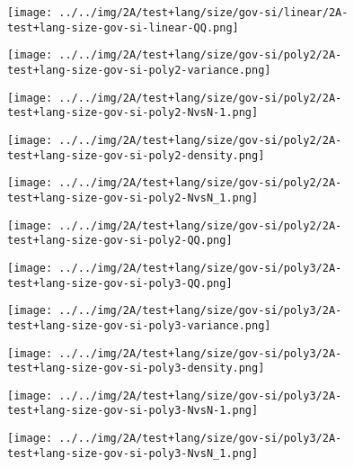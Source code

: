 \begin{figure}[H]
\centering	\texttt{[image: ../../img/2A/test+lang/size/gov-si/linear/2A-test+lang-size-gov-si-linear-QQ.png]}
\end{figure}
\begin{figure}[H]
\centering	\texttt{[image: ../../img/2A/test+lang/size/gov-si/poly2/2A-test+lang-size-gov-si-poly2-variance.png]}
\end{figure}
\begin{figure}[H]
\centering	\texttt{[image: ../../img/2A/test+lang/size/gov-si/poly2/2A-test+lang-size-gov-si-poly2-NvsN-1.png]}
\end{figure}
\begin{figure}[H]
\centering	\texttt{[image: ../../img/2A/test+lang/size/gov-si/poly2/2A-test+lang-size-gov-si-poly2-density.png]}
\end{figure}
\begin{figure}[H]
\centering	\texttt{[image: ../../img/2A/test+lang/size/gov-si/poly2/2A-test+lang-size-gov-si-poly2-NvsN\_1.png]}
\end{figure}
\begin{figure}[H]
\centering	\texttt{[image: ../../img/2A/test+lang/size/gov-si/poly2/2A-test+lang-size-gov-si-poly2-QQ.png]}
\end{figure}
\begin{figure}[H]
\centering	\texttt{[image: ../../img/2A/test+lang/size/gov-si/poly3/2A-test+lang-size-gov-si-poly3-QQ.png]}
\end{figure}
\begin{figure}[H]
\centering	\texttt{[image: ../../img/2A/test+lang/size/gov-si/poly3/2A-test+lang-size-gov-si-poly3-variance.png]}
\end{figure}
\begin{figure}[H]
\centering	\texttt{[image: ../../img/2A/test+lang/size/gov-si/poly3/2A-test+lang-size-gov-si-poly3-density.png]}
\end{figure}
\begin{figure}[H]
\centering	\texttt{[image: ../../img/2A/test+lang/size/gov-si/poly3/2A-test+lang-size-gov-si-poly3-NvsN-1.png]}
\end{figure}
\begin{figure}[H]
\centering	\texttt{[image: ../../img/2A/test+lang/size/gov-si/poly3/2A-test+lang-size-gov-si-poly3-NvsN\_1.png]}
\end{figure}
